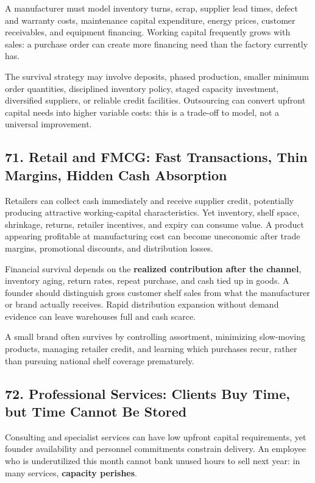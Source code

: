 A manufacturer must model inventory turns, scrap, supplier lead times, defect and warranty costs, maintenance capital expenditure, energy prices, customer receivables, and equipment financing. Working capital frequently grows with sales: a purchase order can create more financing need than the factory currently has.

The survival strategy may involve deposits, phased production, smaller minimum order quantities, disciplined inventory policy, staged capacity investment, diversified suppliers, or reliable credit facilities. Outsourcing can convert upfront capital needs into higher variable costs: this is a trade-off to model, not a universal improvement.

\subsection*{71. Retail and FMCG: Fast Transactions, Thin Margins, Hidden Cash Absorption}

Retailers can collect cash immediately and receive supplier credit, potentially producing attractive working-capital characteristics. Yet inventory, shelf space, shrinkage, returns, retailer incentives, and expiry can consume value. A product appearing profitable at manufacturing cost can become uneconomic after trade margins, promotional discounts, and distribution losses.

Financial survival depends on the \textbf{realized contribution after the channel}, inventory aging, return rates, repeat purchase, and cash tied up in goods. A founder should distinguish gross customer shelf sales from what the manufacturer or brand actually receives. Rapid distribution expansion without demand evidence can leave warehouses full and cash scarce.

A small brand often survives by controlling assortment, minimizing slow-moving products, managing retailer credit, and learning which purchases recur, rather than pursuing national shelf coverage prematurely.

\subsection*{72. Professional Services: Clients Buy Time, but Time Cannot Be Stored}

Consulting and specialist services can have low upfront capital requirements, yet founder availability and personnel commitments constrain delivery. An employee who is underutilized this month cannot bank unused hours to sell next year: in many services, \textbf{capacity perishes}.


